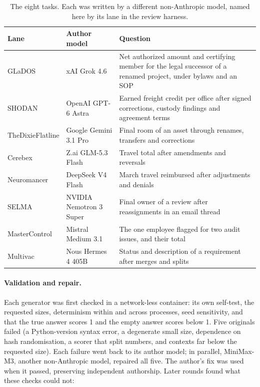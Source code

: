 \documentclass[11pt]{article}
\begin{document}
\begin{table}[t]
\centering\small
\caption{The eight tasks. Each was written by a different non-Anthropic model,
named here by its lane in the review harness.}
\label{tab:tasks}
\begin{tabularx}{\linewidth}{llX}
\toprule
Lane & Author model & Question \\
\midrule
GLaDOS & xAI Grok 4.6 & Net authorized amount and certifying member for the legal successor of a renamed project, under bylaws and an SOP \\
SHODAN & OpenAI GPT-6 Astra & Earned freight credit per office after signed corrections, custody findings and agreement terms \\
TheDixieFlatline & Google Gemini 3.1 Pro & Final room of an asset through renames, transfers and corrections \\
Cerebex & Z.ai GLM-5.3 Flash & Travel total after amendments and reversals \\
Neuromancer & DeepSeek V4 Flash & March travel reimbursed after adjustments and denials \\
SELMA & NVIDIA Nemotron 3 Super & Final owner of a review after reassignments in an email thread \\
MasterControl & Mistral Medium 3.1 & The one employee flagged for two audit issues, and their total \\
Multivac & Nous Hermes 4 405B & Status and description of a requirement after merges and splits \\
\bottomrule
\end{tabularx}
\end{table}

\paragraph{Validation and repair.} Each generator was first checked in a
network-less container: its own self-test, the requested sizes, determinism within
and across processes, seed sensitivity, and that the true answer scores 1 and the
empty answer scores below 1. Five originals failed (a Python-version syntax
error, a degenerate small size, dependence on hash randomisation, a scorer that
split numbers, and contexts far below the requested size). Each failure went back
to its author model; in parallel, MiniMax-M3, another non-Anthropic model, repaired
all five. The author's fix was used when it passed, preserving independent
authorship. Later rounds found what these checks could not:
\end{document}
